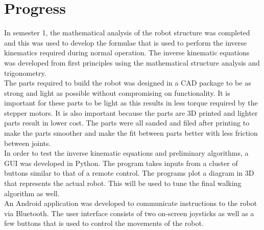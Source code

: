
\section{Progress}

In semester 1, the mathematical analysis of the robot structure was completed and this was used to develop the formulae that is used to perform the inverse kinematics required during normal operation. The inverse kinematic equations was developed from first principles using the mathematical structure analysis and trigonometry.\\

The parts required to build the robot was designed in a CAD package to be as strong and light as possible without compromising on functionality. It is important for these parts to be light as this results in less torque required by the stepper motors. It is also important because the parts are 3D printed and lighter parts result in lower cost. The parts were all sanded and filed after printing to make the parts smoother and make the fit between parts better with less friction between joints.\\

In order to test the inverse kinematic equations and preliminary algorithms, a GUI was developed in Python. The program takes inputs from a cluster of buttons similar to that of a remote control. The programs plot a diagram in 3D that represents the actual robot. This will be used to tune the final walking algorithm as well.\\

An Android application was developed to communicate instructions to the robot via Bluetooth. The user interface consists of two on-screen joysticks as well as a few buttons that is used to control the movements of the robot.\\

\newpage



